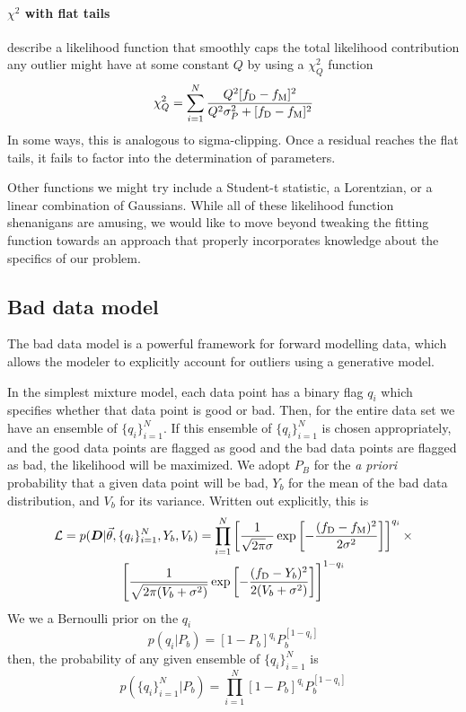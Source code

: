 \documentclass[preprint]{aastex} %
\newcommand{\qN}{\{q_i\}_{i=1}^N}
\newcommand{\vt}{\vec{\theta}}
\newcommand{\fM}{f_{\rm M}}
\newcommand{\fD}{f_{\rm D}}
\begin{document}
\paragraph{$\chi^2$ with flat tails}
\citet{hbl10} describe a likelihood function that smoothly caps the total likelihood contribution any outlier might have at some constant $Q$ by using a $\chi^2_Q$ function
\begin{equation}
  \chi^2_Q = \sum_{i = 1}^N \frac{Q^2 [\fD - \fM]^2}{Q^2 \sigma_P^2 + [\fD - \fM]^2}
\end{equation}
In some ways, this is analogous to sigma-clipping. Once a residual reaches the flat tails, it fails to factor into the determination of parameters.

Other functions we might try include a Student-t statistic, a Lorentzian, or a linear combination of Gaussians. While all of these likelihood function shenanigans are amusing, we would like to move beyond tweaking the fitting function towards an approach that properly incorporates knowledge about the specifics of our problem.

\subsection{Bad data model}
The bad data model \citep{pre97,hbl10} is a powerful framework for forward modelling data, which allows the modeler to explicitly account for outliers using a generative model.

In the simplest mixture model, each data point has a binary flag $q_i$ which specifies whether that data point is good or bad. Then, for the entire data set we have an ensemble of $\qN$. If this ensemble of $\qN$ is chosen appropriately, and the good data points are flagged as good and the bad data points are flagged as bad, the likelihood will be maximized. We adopt $P_B$ for the \emph{a priori} probability that a given data point will be bad, $Y_b$ for the mean of the bad data distribution, and $V_b$ for its variance. Written out explicitly, this is
\begin{multline}
  {\cal L} = p({\bm D} | \vt,\qN, Y_b,V_b) = \prod_{i=1}^N \left [ \frac{1}{\sqrt{2 \pi} \sigma} \exp \left[ - \frac{(\fD - \fM)^2}{2 \sigma^2} \right] \right ]^{q_i}  \times \\
  \left [ \frac{1}{\sqrt{2 \pi (V_b + \sigma^2)}} \exp \left[ - \frac{(\fD - Y_b)^2}{2 (V_b + \sigma^2)} \right]
  \right ]^{1 - q_i}
\end{multline}
We we a Bernoulli prior on the $q_i$
\begin{equation}
  p(q_i | P_b) = [1-P_b]^{q_i} P_b^{[1-q_i]}
\end{equation}
then, the probability of any given ensemble of $\qN$ is 
\begin{equation}
  p(\qN | P_b) = \prod_{i=1}^N [1-P_b]^{q_i} P_b^{[1-q_i]}
\end{equation}
\end{document}
